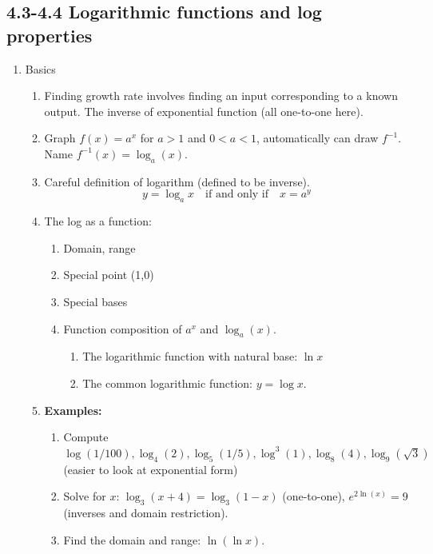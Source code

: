 \documentclass{article}
\begin{document}
\subsection{4.3-4.4 Logarithmic functions and log properties}


\begin{enumerate}
\item Basics
\begin{enumerate}
\item Finding growth rate involves finding an input corresponding to a known output. The inverse of exponential function (all one-to-one here).
\item Graph $f(x)=a^x$ for $a>1$ and $0<a<1$, automatically can draw $f^{-1}$. Name $f^{-1}(x)=\log_a(x)$.
\item Careful definition of logarithm (defined to be inverse).
$$
y = \log_ax \quad\text{if and only if}\quad x = a^y
$$
\item The log as a function:
\begin{enumerate}
\item Domain, range
\item Special point (1,0)
\item Special bases
\item Function composition of $a^x$ and $\log_a(x)$.
\begin{enumerate}
\item The logarithmic function with natural base: $\ln x$
\item The common logarithmic function: $y = \log x$.
\end{enumerate}
\end{enumerate}
\item {\bf Examples:} 
\begin{enumerate}
\item Compute $\log(1/100), \log_4(2), \log_5(1/5), \log^3(1), \log_8(4), \log_9(\sqrt{3})$ (easier to look at exponential form)
\item Solve for $x$: $\log_3(x+4)=\log_3(1-x)$ (one-to-one), $e^{2\ln(x)} = 9$ (inverses and domain restriction).  
\item Find the domain and range: $\ln(\ln x)$.
\end{enumerate}
\end{enumerate}


\end{enumerate}
\end{document}

